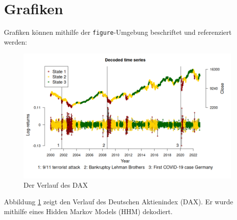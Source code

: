 \documentclass{article}
\renewcommand{\figurename}{Abbildung}
\begin{document}
\section{Grafiken}

Grafiken können mithilfe der \texttt{figure}-Umgebung beschriftet und referenziert werden:

\begin{figure}[ht] %
    \centering
    \includegraphics[width = \textwidth]{time_series.png}
    \caption{Der Verlauf des DAX}
    \label{fig:dax}
\end{figure}

Abbildung \ref{fig:dax} zeigt den Verlauf des Deutschen Aktienindex (DAX). Er wurde mithilfe eines Hidden Markov Models (HHM) dekodiert.
\end{document}
